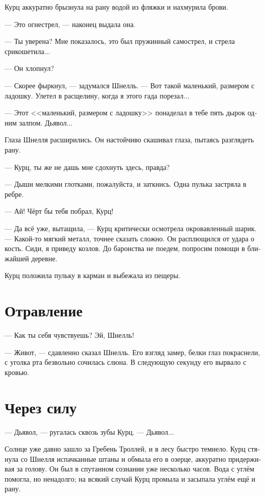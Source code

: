 \documentclass[a4paper,10pt,fleqn]{book}\usepackage{polyglossia}\setdefaultlanguage[babelshorthands=true]{russian}\setotherlanguage{english}\defaultfontfeatures{Ligatures=TeX,Mapping=tex-text}\usepackage{xcolor}\newcommand{\ml}[3]{#2}
\begin{document}
Курц аккуратно брызнула на рану водой из фляжки и нахмурила брови.

--- Это огнестрел, --- наконец выдала она.

--- Ты уверена?
Мне показалось, это был пружинный самострел, и стрела срикошетила...

--- Он хлопнул?

--- Скорее фыркнул, --- задумался Шнелль.
--- Вот такой маленький, размером с ладошку.
Улетел в расщелину, когда я этого гада порезал...

--- Этот <<маленький, размером с ладошку>> понаделал в тебе пять дырок одним залпом.
Дьявол...

Глаза Шнелля расширились.
Он настойчиво скашивал глаза, пытаясь разглядеть рану.

--- Курц, ты же не дашь мне сдохнуть здесь, правда?

--- Дыши мелкими глотками, пожалуйста, и заткнись.
Одна пулька застряла в ребре.

--- Ай!
Чёрт бы тебя побрал, Курц!

--- Да всё уже, вытащила, --- Курц критически осмотрела окровавленный шарик.
--- Какой-то мягкий металл, точнее сказать сложно.
Он расплющился от удара о кость.
Сиди, я приведу козлов.
До баронства не поедем, попросим помощи в ближайшей деревне.

Курц положила пульку в карман и выбежала из пещеры.

\section{Отравление}

--- Как ты себя чувствуешь?
Эй, Шнелль!

--- Живот, --- сдавленно сказал Шнелль.
Его взгляд замер, белки глаз покраснели, с уголка рта безвольно сочилась слюна.
В следующую секунду его вырвало с кровью.

\section{Через силу}

--- Дьявол, --- ругалась сквозь зубы Курц.
--- Дьявол...

Солнце уже давно зашло за Гребень Троллей, и в лесу быстро темнело.
Курц стянула со Шнелля испачканные штаны и обмыла его в озерце, аккуратно придерживая за голову.
Он был в спутанном сознании уже несколько часов.
Вода с углём помогла, но ненадолго;
на всякий случай Курц промыла и засыпала углём ещё и рану.
\end{document}
